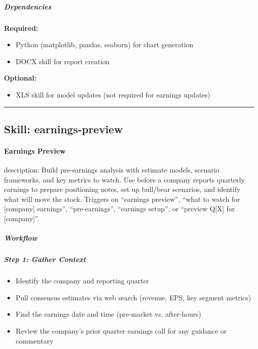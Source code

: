 \documentclass[11pt]{article}
\begin{document}
\subparagraph{Dependencies}\mbox{}\par

\textbf{Required:}

\begin{itemize}[leftmargin=*,itemsep=2pt,topsep=2pt]
\item {} Python (matplotlib, pandas, seaborn) for chart generation
\item {} DOCX skill for report creation
\end{itemize}

\textbf{Optional:}

\begin{itemize}[leftmargin=*,itemsep=2pt,topsep=2pt]
\item {} XLS skill for model updates (not required for earnings updates)
\end{itemize}

\vspace{0.8em}\hrule\vspace{0.8em}

\subsection{Skill: earnings-preview}\label{file:earnings-reviewer-skills-earnings-preview-SKILL-md}

\paragraph{Earnings Preview}\mbox{}\par

description: Build pre-earnings analysis with estimate models, scenario frameworks, and key metrics to watch. Use before a company reports quarterly earnings to prepare positioning notes, set up bull/bear scenarios, and identify what will move the stock. Triggers on ``earnings preview'', ``what to watch for [company] earnings'', ``pre-earnings'', ``earnings setup'', or ``preview Q[X] for [company]''.


\subparagraph{Workflow}\mbox{}\par

\subparagraph{Step 1: Gather Context}\mbox{}\par

\begin{itemize}[leftmargin=*,itemsep=2pt,topsep=2pt]
\item {} Identify the company and reporting quarter
\item {} Pull consensus estimates via web search (revenue, EPS, key segment metrics)
\item {} Find the earnings date and time (pre-market vs. after-hours)
\item {} Review the company's prior quarter earnings call for any guidance or commentary
\end{itemize}
\end{document}
